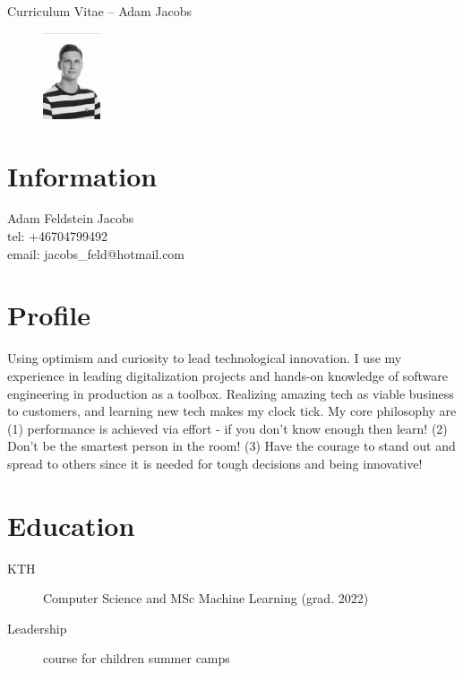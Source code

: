 \documentclass[margin,line,a4paper]{resume}
\begin{document}
{\sc \Large Curriculum Vitae -- Adam Jacobs}
\begin{resume}
    \vspace{0.01cm}
    \begin{figure}
        \vspace{-1cm}
       \begin{center}
       \includegraphics[width=0.15\textwidth]{adamjacobs}
       \end{center}
        \vspace{-1cm}
    \end{figure}
    
    \section{\mysidestyle Information}%
    Adam Feldstein Jacobs \\
    tel: +46704799492 \\
    email: jacobs\_feld@hotmail.com
    \href{} \\

\section{\mysidestyle Profile}\vspace{1mm}
Using optimism and curiosity to lead technological innovation. I use my experience in leading digitalization projects and hands-on knowledge of software engineering in production as a toolbox. Realizing amazing tech as viable business to customers, and learning new tech makes my clock tick. My core philosophy are (1) performance is achieved via effort - if you don't know enough then learn! (2) Don't be the smartest person in the room! (3) Have the courage to stand out and spread to others since it is needed for tough decisions and being innovative! 

\section{\mysidestyle Education}\vspace{1mm}
    \begin{description}
        \item[KTH] Computer Science and MSc Machine Learning (grad. 2022)
         \item[Leadership] course for children summer camps
    \end{description} 


\end{resume}
\end{document}
